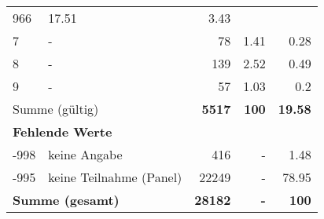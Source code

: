 \begin{longtable}{lXrrr}
       \num{966} &
       \num[round-mode=places,round-precision=2]{17.51} &
         \num[round-mode=places,round-precision=2]{3.43} \\

     7 &
     \multicolumn{1}{X}{ -  } &


       \num{78} &
       \num[round-mode=places,round-precision=2]{1.41} &
         \num[round-mode=places,round-precision=2]{0.28} \\

     8 &
     \multicolumn{1}{X}{ -  } &


       \num{139} &
       \num[round-mode=places,round-precision=2]{2.52} &
         \num[round-mode=places,round-precision=2]{0.49} \\

     9 &
     \multicolumn{1}{X}{ -  } &


       \num{57} &
       \num[round-mode=places,round-precision=2]{1.03} &
         \num[round-mode=places,round-precision=2]{0.2} \\
     \midrule
     \multicolumn{2}{l}{Summe (gültig)} &
       \textbf{\num{5517}} &
     \textbf{\num{100}} &
       \textbf{\num[round-mode=places,round-precision=2]{19.58}} \\
     \multicolumn{5}{l}{\textbf{Fehlende Werte}}\\
       -998 &
       keine Angabe &
         \num{416} &
        - &
         \num[round-mode=places,round-precision=2]{1.48} \\
       -995 &
       keine Teilnahme (Panel) &
         \num{22249} &
        - &
         \num[round-mode=places,round-precision=2]{78.95} \\
     \midrule
     \multicolumn{2}{l}{\textbf{Summe (gesamt)}} &
          \textbf{\num{28182}} &
        \textbf{-} &
        \textbf{\num{100}} \\
     \bottomrule
     \end{longtable}
     
